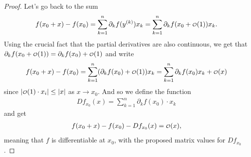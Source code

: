 \begin{proof}
	Let's go back to the sum
	\begin{align*}
		f(x_{0} + x) - f(x_{0}) = \sum_{k=1}^{n} \partial_{k}f(y^{(k)})x_{k} = \sum_{k=1}^{n} \partial_{k}f(x_{0} + \smalO(1))x_{k}.
	\end{align*}
	Using the crucial fact that the partial derivatives are also continuous, we get that $\partial_{k}f(x_{0} + \smalO(1)) = \partial_{k}f(x_{0}) + \smalO(1)$ and write
	\begin{align*}
		f(x_{0} + x) - f(x_{0}) = \sum_{k=1}^{n} (\partial_{k}f(x_{0})+ \smalO(1))x_{k} = \sum_{k=1}^{n} \partial_{k}f(x_{0})x_{k} + \smalO( x)
	\end{align*}
	since $\left| \smalO(1) \cdot x_{i} \right| \leq \left| x \right|$ as $x \to x_{0}$. And so we define the function
	\begin{align*}
		Df_{x_{0}}(x) = \sum_{k=1}^{n} \partial_{k}f(x_{0}) \cdot x_{k}
	\end{align*}
	and get
	\begin{align*}
		f(x_{0} + x) - f(x_{0}) - Df_{x_{0}}(x) = \smalO(x ),
	\end{align*}
	meaning that $f$ is differentiable at $x_{0}$, with the proposed matrix values for $Df_{x_{0}}$.
\end{proof}
